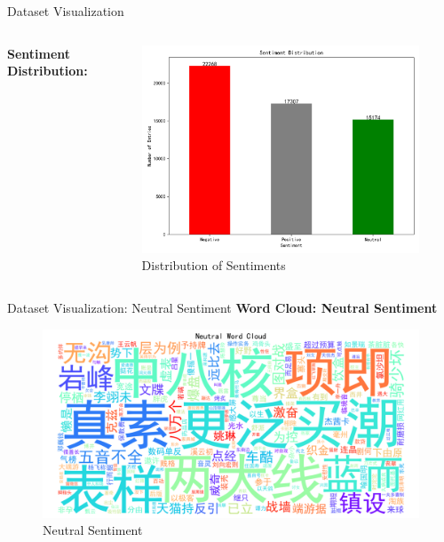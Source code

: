 \documentclass[aspectratio=169]{beamer}
\begin{document}
\begin{frame}{Dataset Visualization}
  \begin{columns}[t]
      \textbf{Sentiment Distribution:}
      \begin{figure}
          \centering
          \includegraphics[width=\linewidth]{sentiment_distribution.png}
          \caption{Distribution of Sentiments}
      \end{figure}
  \end{columns}
\end{frame}

\begin{frame}{Dataset Visualization: Neutral Sentiment}
  \textbf{Word Cloud: Neutral Sentiment}
  \begin{figure}
    \centering
    \includegraphics[width=0.7\linewidth]{wordcloud_neutral.png}
    \caption{\small Neutral Sentiment}
  \end{figure}
\end{frame}
\end{document}
